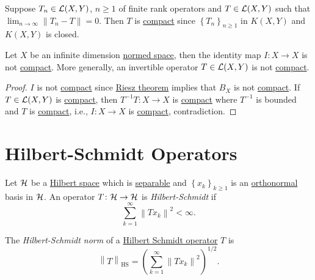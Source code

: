 \begin{remark}
	Suppose \(T_n\in \mathcal{\MakeUppercase{l}} (X, Y)\), \(n\geq 1\) of finite rank operators and \(T\in \mathcal{\MakeUppercase{l}} (X, Y)\) such that \(\lim_{n \to \infty} \left\lVert T_n - T\right\rVert =0\). Then \(T\) is \hyperref[def:compact-op]{compact} since \(\left\{ T_n \right\} _{n\geq 1}\) in \(K(X, Y)\) and \(K(X, Y)\) is closed.
\end{remark}

\begin{proposition}
	Let \(X\) be an infinite dimension \hyperref[def:normed-vector-space]{normed space}, then the identity map \(I\colon X\to X\) is not \hyperref[def:compact-op]{compact}. More generally, an invertible operator \(T\in \mathcal{\MakeUppercase{l}} (X, Y)\) is not \hyperref[def:compact-op]{compact}.
\end{proposition}
\begin{proof}
	\(I\) is not \hyperref[def:compact-op]{compact} since \hyperref[thm:Riesz]{Riesz theorem} implies that \(B_X\) is not \hyperref[def:compact]{compact}. If \(T\in \mathcal{\MakeUppercase{l}} (X, Y)\) is \hyperref[def:compact-op]{compact}, then \(T^{-1} T\colon X\to X\) is \hyperref[def:compact-op]{compact} where \(T^{-1} \) is bounded and \(T\) is \hyperref[def:compact-op]{compact}, i.e., \(I\colon X\to X\) is \hyperref[def:compact-op]{compact}, contradiction.
\end{proof}

\section{Hilbert-Schmidt Operators}
\begin{definition}\label{def:Hilbert-Schmidt-op}
	Let \(\mathcal{\MakeUppercase{h}} \) be a \hyperref[def:Hilbert-space]{Hilbert space} which is \hyperref[def:separable]{separable} and \(\left\{ x_k \right\} _{k\geq 1}\) is an \hyperref[def:orthonormal-system]{orthonormal} basis in \(\mathcal{\MakeUppercase{h}} \). An operator \(T\colon \mathcal{\MakeUppercase{h}} \to \mathcal{\MakeUppercase{h}} \) is \emph{Hilbert-Schmidt} if
	\[
		\sum_{k=1}^{\infty} \left\lVert T x_{k} \right\rVert ^{2} < \infty.
	\]
\end{definition}

\begin{definition}\label{def:Hilbert-Schmidt-norm}
	The \emph{Hilbert-Schmidt norm} of a \hyperref[def:Hilbert-Schmidt-op]{Hilbert Schmidt operator} \(T\) is
	\[
		\left\lVert T\right\rVert _{\mathrm{HS} } = \left( \sum_{k=1}^{\infty} \left\lVert T x_{k} \right\rVert ^2 \right) ^{1 / 2}.
	\]
\end{definition}

